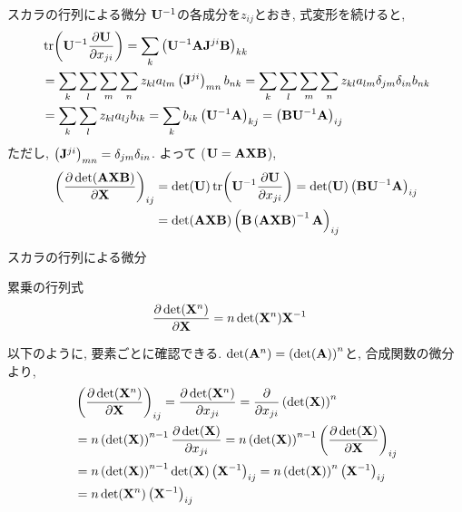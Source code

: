 \documentclass[dvipdfmx,notheorems,t]{beamer}
\begin{document}
\begin{frame}{スカラの行列による微分}
$\vb{U}^{-1}$の各成分を$z_{ij}$とおき, 式変形を続けると,
\begin{align*}
  & \tr(\vb{U}^{-1} \pdv{\vb{U}}{x_{ji}})
    = \sum_k \left( \vb{U}^{-1} \vb{A} \vb{J}^{ji} \vb{B} \right)_{kk} \\
    &= \sum_k \sum_l \sum_m \sum_n z_{kl} a_{lm} \left( \vb{J}^{ji} \right)_{mn} b_{nk}
    = \sum_k \sum_l \sum_m \sum_n z_{kl} a_{lm} \delta_{jm} \delta_{in} b_{nk} \\
    &= \sum_k \sum_l z_{kl} a_{lj} b_{ik}
    = \sum_k b_{ik} \left( \vb{U}^{-1} \vb{A} \right)_{kj}
    = \left( \vb{B} \vb{U}^{-1} \vb{A} \right)_{ij}
\end{align*}
ただし, $\left( \vb{J}^{ji} \right)_{mn} = \delta_{jm} \delta_{in}$.
よって ($\vb{U} = \vb{A} \vb{X} \vb{B}$),
\begin{align*}
  \left( \pdv{\det(\vb{A} \vb{X} \vb{B})}{\vb{X}} \right)_{ij}
    &= \det(\vb{U}) \tr(\vb{U}^{-1} \pdv{\vb{U}}{x_{ji}})
    = \det(\vb{U}) \left( \vb{B} \vb{U}^{-1} \vb{A} \right)_{ij} \\
    &= \det(\vb{A} \vb{X} \vb{B})
      \left( \vb{B} \left( \vb{A} \vb{X} \vb{B} \right)^{-1} \vb{A} \right)_{ij}
\end{align*}
\end{frame}

\begin{frame}{スカラの行列による微分}
\begin{block}{累乗の行列式}
  \begin{align*}
    \pdv{\det(\vb{X}^n)}{\vb{X}} &= n \det(\vb{X}^n) \vb{X}^{-1}
  \end{align*}
\end{block}

以下のように, 要素ごとに確認できる.
$\det(\vb{A}^n) = \left( \det(\vb{A}) \right)^n$と, 合成関数の微分より,
\begin{align*}
  & \left( \pdv{\det(\vb{X}^n)}{\vb{X}} \right)_{ij}
    = \pdv{\det(\vb{X}^n)}{x_{ji}}
    = \pdv{x_{ji}} \left( \det(\vb{X}) \right)^n \\
    &= n \left( \det(\vb{X}) \right)^{n - 1} \pdv{\det(\vb{X})}{x_{ji}}
    = n \left( \det(\vb{X}) \right)^{n - 1} \left( \pdv{\det(\vb{X})}{\vb{X}} \right)_{ij} \\
    &= n \left( \det(\vb{X}) \right)^{n - 1} \det(\vb{X}) \left( \vb{X}^{-1} \right)_{ij}
    = n \left( \det(\vb{X}) \right)^n \left( \vb{X}^{-1} \right)_{ij} \\
    &= n \det(\vb{X}^n) \left( \vb{X}^{-1} \right)_{ij}
\end{align*}
\end{frame}
\end{document}
